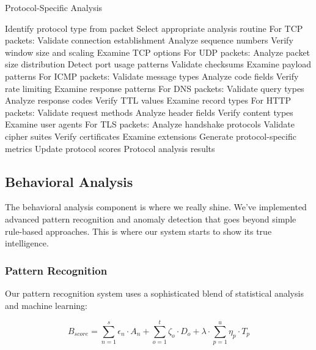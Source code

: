 \documentclass[conference]{IEEEtran}
\begin{document}
\begin{algorithm}[H]
\caption{Protocol-Specific Analysis}
\begin{algorithmic}[1]
\STATE Identify protocol type from packet
\STATE Select appropriate analysis routine
\STATE For TCP packets:
\STATE \quad Validate connection establishment
\STATE \quad Analyze sequence numbers
\STATE \quad Verify window size and scaling
\STATE \quad Examine TCP options
\STATE For UDP packets:
\STATE \quad Analyze packet size distribution
\STATE \quad Detect port usage patterns
\STATE \quad Validate checksums
\STATE \quad Examine payload patterns
\STATE For ICMP packets:
\STATE \quad Validate message types
\STATE \quad Analyze code fields
\STATE \quad Verify rate limiting
\STATE \quad Examine response patterns
\STATE For DNS packets:
\STATE \quad Validate query types
\STATE \quad Analyze response codes
\STATE \quad Verify TTL values
\STATE \quad Examine record types
\STATE For HTTP packets:
\STATE \quad Validate request methods
\STATE \quad Analyze header fields
\STATE \quad Verify content types
\STATE \quad Examine user agents
\STATE For TLS packets:
\STATE \quad Analyze handshake protocols
\STATE \quad Validate cipher suites
\STATE \quad Verify certificates
\STATE \quad Examine extensions
\STATE Generate protocol-specific metrics
\STATE Update protocol scores
\RETURN Protocol analysis results
\end{algorithmic}
\end{algorithm}

\subsection{Behavioral Analysis}
The behavioral analysis component is where we really shine. We've implemented advanced pattern recognition and anomaly detection that goes beyond simple rule-based approaches. This is where our system starts to show its true intelligence.

\subsubsection{Pattern Recognition}
Our pattern recognition system uses a sophisticated blend of statistical analysis and machine learning:

\begin{equation}
B_{score} = \sum_{n=1}^{s} \epsilon_n \cdot A_n + \sum_{o=1}^{t} \zeta_o \cdot D_o + \lambda \cdot \sum_{p=1}^{u} \eta_p \cdot T_p
\end{equation}
\end{document}
